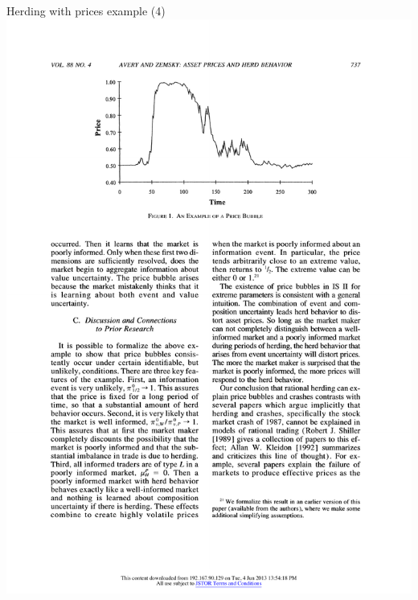 \documentclass[english,10pt
,aspectratio=169
]{beamer}
\begin{document}
\begin{frame}{Herding with prices example (4)}
	\includegraphics[width=0.4\paperwidth]{pics/PriceBubble}

\end{frame}
\end{document}
